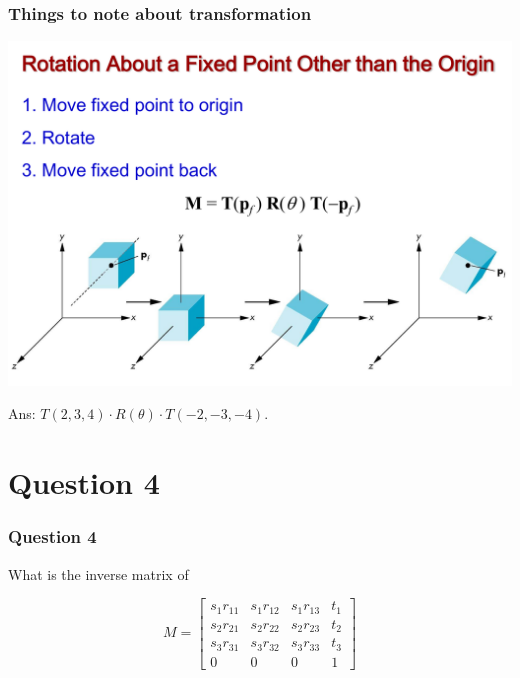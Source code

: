 \documentclass{beamer}
\begin{document}
\begin{frame}
    \frametitle{Things to note about transformation}


    \begin{center}
        \includegraphics[scale=0.3]{rotate-about-fixed-pt.png}
    \end{center}

    \begin{tcolorbox}
        Ans: $T(2,3,4) \cdot R(\theta) \cdot T(-2, -3, -4)$.
    \end{tcolorbox}

\end{frame}

\section{Question 4}

\begin{frame}
    \frametitle{Question 4}

    What is the inverse matrix of 

    \begin{center}
        $$ M = 
        \left[
        \begin{matrix}
            s_1 r_{11} & s_1 r_{12} & s_1 r_{13} & t_1\\
            s_2 r_{21} & s_2 r_{22} & s_2 r_{23} & t_2\\
            s_3 r_{31} & s_3 r_{32} & s_3 r_{33} & t_3\\
            0 & 0 & 0 & 1
        \end{matrix}
        \right]
        $$
        
    \end{center}

\end{frame}
\end{document}
